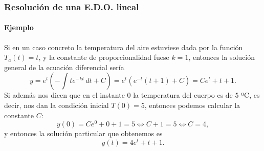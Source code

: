 \begin{frame}
\frametitle{Resolución de una E.D.O. lineal}
\framesubtitle{Ejemplo}
Si en un caso concreto la temperatura del aire estuviese dada por la función $T_a(t)=t$, y la constante de proporcionalidad fuese $k=1$, entonces la solución general de la ecuación diferencial sería
\[
y=e^{t}\left(-\int te^{-kt}\,dt+C\right)=e^t(e^{-t}(t+1)+C)=Ce^t+t+1.
\]
Si además nos dicen que en el instante $0$ la temperatura del cuerpo es de $5$ ºC, es decir, nos dan la condición inicial $T(0)=5$, entonces podemos calcular la constante $C$:
\[
y(0)=Ce^0+0+1=5 \Leftrightarrow C+1=5 \Leftrightarrow C=4,
\]
y entonces la solución particular que obtenemos es
\[
y(t)=4e^t+t+1.
\]
\end{frame}
